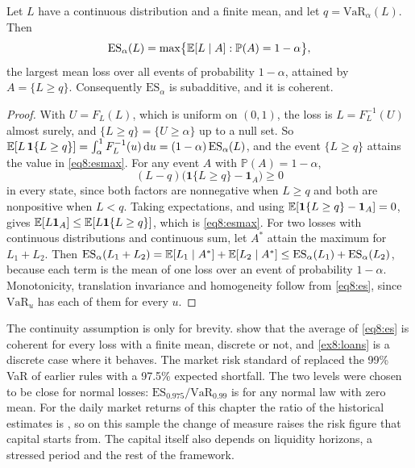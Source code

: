 \begin{chapterrefs}
\begin{proposition}\label{prop8:es}
Let $L$ have a continuous distribution and a finite mean, and let $q=\mathrm{VaR}_\alpha(L)$. Then
\begin{equation}\label{eq8:esmax}
  \mathrm{ES}_\alpha(L) = \max\bigl\{\mathbb{E}[L\mid A] : \mathbb P(A)=1-\alpha\bigr\},
\end{equation}
the largest mean loss over all events of probability $1-\alpha$, attained by $A=\{L\ge q\}$.
Consequently $\mathrm{ES}_\alpha$ is subadditive, and it is coherent.
\end{proposition}
\begin{proof}
With $U=F_L(L)$, which is uniform on $(0,1)$, the loss is $L=F_L^{-1}(U)$ almost surely, and
$\{L\ge q\}=\{U\ge\alpha\}$ up to a null set. So
$\mathbb{E}[L\,\mathbf 1\{L\ge q\}]=\int_\alpha^1F_L^{-1}(u)\,\mathrm{d} u=(1-\alpha)\,\mathrm{ES}_\alpha(L)$, and the
event $\{L\ge q\}$ attains the value in \cref{eq8:esmax}. For any event $A$ with $\mathbb P(A)=1-\alpha$,
\[
  (L-q)\bigl(\mathbf 1\{L\ge q\}-\mathbf 1_A\bigr)\ge0
\]
in every state, since both factors are nonnegative when $L\ge q$ and both are nonpositive when
$L<q$. Taking expectations, and using $\mathbb{E}[\mathbf 1\{L\ge q\}-\mathbf 1_A]=0$, gives
$\mathbb{E}[L\mathbf 1_A]\le\mathbb{E}[L\mathbf 1\{L\ge q\}]$, which is \cref{eq8:esmax}. For two losses with
continuous distributions and continuous sum, let $A^*$ attain the maximum for $L_1+L_2$. Then
$\mathrm{ES}_\alpha(L_1+L_2)=\mathbb{E}[L_1\mid A^*]+\mathbb{E}[L_2\mid A^*]\le\mathrm{ES}_\alpha(L_1)+\mathrm{ES}_\alpha(L_2)$,
because each term is the mean of one loss over an event of probability $1-\alpha$. Monotonicity,
translation invariance and homogeneity follow from \cref{eq8:es}, since $\mathrm{VaR}_u$ has each of
them for every $u$.
\end{proof}

The continuity assumption is only for brevity. \textcite{acerbi2002} show that the average of
\cref{eq8:es} is coherent for every loss with a finite mean, discrete or not, and \cref{ex8:loans}
is a discrete case where it behaves. The market risk standard of
\textcite{bcbs2019} replaced the 99\% VaR of earlier rules with a 97.5\% expected shortfall. The two
levels were chosen to be close for normal losses: $\mathrm{ES}_{0.975}/\mathrm{VaR}_{0.99}$ is
\esRatioNormal{} for any normal law with zero mean. For the daily market returns of this chapter the
ratio of the historical estimates is \esRatioHist, so on this sample the change of measure raises the
risk figure that capital starts from. The capital itself also depends on liquidity horizons, a stressed
period and the rest of the framework.


\end{chapterrefs}
